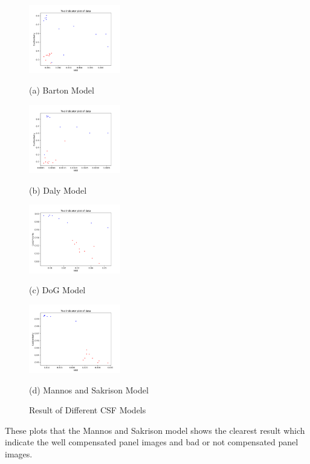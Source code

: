 \documentclass{article}
\begin{document}
\begin{figure}[h]
\begin{minipage}[b]{0.48\linewidth}
  \centering
  \centerline{\includegraphics[width=4.0cm]{images/Barton_CSFed_G_A4_01R_23b_result.png}}
  \centerline{(a) Barton Model}\medskip
\end{minipage}
\hfill
\begin{minipage}[b]{0.48\linewidth}
  \centering
  \centerline{\includegraphics[width=4.0cm]{images/Daly_CSFed_G_A4_01r_23b_result.png}}
  \centerline{(b)  Daly Model}\medskip
\end{minipage}
\begin{minipage}[b]{.48\linewidth}
  \centering
  \centerline{\includegraphics[width=4.0cm]{images/NewDoG_Streched_CSFed_A1_G_01r_23b_result.png}}
  \centerline{(c) DoG Model}\medskip
\end{minipage}
\hfill
\begin{minipage}[b]{0.48\linewidth}
  \centering
  \centerline{\includegraphics[width=4.0cm]{images/MS_STRECH_CSFED_G_A1_01r_23b_result.png}}
  \centerline{(d) Mannos and Sakrison Model}\medskip
\end{minipage}
\caption{Result of Different CSF Models}
\label{fig5}
%
\end{figure}
These plots that the Mannos and Sakrison model shows the clearest result which indicate the well compensated panel images and bad or not compensated panel images. 
\end{document}
